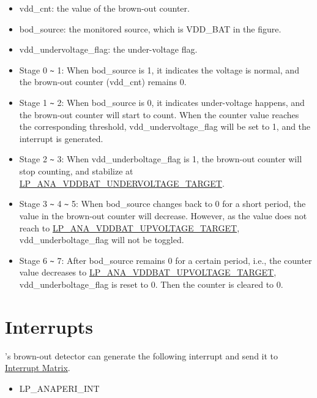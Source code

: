 \documentclass[main\_\_EN.tex]{subfiles}
\begin{document}
\begin{itemize}
    \begin{itemize}
        \item vdd\_cnt: the value of the brown-out counter.
        \item bod\_source: the monitored source, which is VDD\_BAT in the figure.
        \item vdd\_undervoltage\_flag: the under-voltage flag.
    \end{itemize}
    \begin{itemize}
        \item Stage 0 \verb+~+ 1: When bod\_source is 1, it indicates the voltage is normal, and the brown-out counter (vdd\_cnt) remains 0.
        \item Stage 1 \verb+~+ 2: When bod\_source is 0, it indicates under-voltage happens, and the brown-out counter will start to count. When the counter value reaches the corresponding threshold, vdd\_undervoltage\_flag will be set to 1, and the interrupt is generated.
        \item Stage 2 \verb+~+ 3: When vdd\_underboltage\_flag is 1, the brown-out counter will stop counting, and stabilize at \hyperref[fielddesc:LPANAVDDBATUNDERVOLTAGETARGET]{LP\_ANA\_VDDBAT\_UNDERVOLTAGE\_TARGET}.
        \item Stage 3 \verb+~+ 4 \verb+~+ 5: When bod\_source changes back to 0 for a short period, the value in the brown-out counter will decrease. However, as the value does not reach to \hyperref[fielddesc:LPANAVDDBATUPVOLTAGETARGET]{LP\_ANA\_VDDBAT\_UPVOLTAGE\_TARGET}, vdd\_underboltage\_flag will not be toggled.
        \item Stage 6 \verb+~+ 7: After bod\_source remains 0 for a certain period, i.e., the counter value decreases to \hyperref[fielddesc:LPANAVDDBATUPVOLTAGETARGET]{LP\_ANA\_VDDBAT\_UPVOLTAGE\_TARGET}, vdd\_underboltage\_flag is reset to 0. Then the counter is cleared to 0.
    \end{itemize}
\end{itemize}


\section{Interrupts}

\chipname{}'s brown-out detector can generate the following interrupt and send it to \hyperref[mod:intmtrx]{Interrupt Matrix}.

    \begin{itemize}
        \item LP\_ANAPERI\_INT
    \end{itemize}
\end{document}
